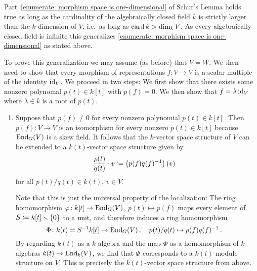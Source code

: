 \begin{remark}
  Part~\ref{enumerate: morphism space is one-dimensional} of Schur’s Lemma holds true as long as the cardinality of the algebraically closed field $k$ is strictly larger than the $k$-dimension of $V$, i.e.\ as long as $\operatorname{card} k > \dim_k V$.
  As every algebraically closed field is infinite this generalizes \ref{enumerate: morphism space is one-dimensional} as stated above.
  
  To prove this generalization we may assume (as before) that $V = W$.
  We then need to show that every morphism of representations $f \colon V \to V$ is a scalar multiple of the identity $\operatorname{id}_V$.
  We proceed in two steps:
  We first show that there exists some nonzero polynomal $p(t) \in k[t]$ with $p(f) = 0$.
  We then show that $f = \lambda \operatorname{id}_V$ where $\lambda \in k$ is a root of $p(t)$.
  \begin{enumerate}[label=\arabic*)]
    \item
      Suppose that $p(f) \neq 0$ for every nonzero polynomial $p(t) \in k[t]$.
      Then $p(f) \colon V \to V$ is an isomorphism for every nonzero $p(t) \in k[t]$ because $\operatorname{End}_G(V)$ is a skew field.
      It follows that the $k$-vector space structure of $V$ can be extended to a $k(t)$-vector space structure given by
      \[
                  \frac{p(t)}{q(t)} \cdot v
        \coloneqq  \left( p(f) q(f)^{-1} \right)(v)
      \]
      for all $p(t)/q(t) \in k(t)$, $v \in V$.
      
      Note that this is just the universal property of the localization:
      The ring homomorphism $\varphi \colon k[t] \to \operatorname{End}_G(V)$, $p(t) \mapsto p(f)$ maps every element of $S \coloneqq k[t] \smallsetminus \{0\}$ to a unit, and therefore induces a ring homomorphism
      \[
                \Phi
        \colon  k(t)
        =       S^{-1} k[t]
        \to     \operatorname{End}_G(V) \,,
        \quad   p(t)/q(t)
        \mapsto p(f) q(f)^{-1} \,.
      \]
      By regarding $k(t)$ as a $k$-algebra and the map $\Phi$ as a homomorphism of $k$-algebras $k(t) \to \operatorname{End}_k(V)$, we find that $\Phi$ corresponds to a $k(t)$-module structure on $V$.
      This is precisely the $k(t)$-vector space structure from above.
      

\end{enumerate}
\end{remark}
